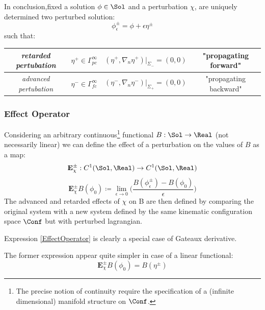 \documentclass[Main]{subfiles}
\begin{document}
		In conclusion,fixed a solution $\phi\in \Sol$ and a perturbation $\chi$, are uniquely determined two perturbed solution:
   		\begin{equation}\label{PerturbedSolution}
   			\phi^\pm_\epsilon = \phi + \epsilon \eta^\pm
   		\end{equation}
   		such that:
 		\begin{center}   \begin{tabular}{|c|c|c|c|}
   		\hline
  	 		\emph{retarded pertubation} & $\eta^+ \in \Gamma^\infty_{pc}$ & $(\eta^+, \nabla_n \eta^+ ) \big \vert_{\Sigma_{-}} = (0,0)$ & "propagating forward" \\
  	 		\hline
   			\emph{advanced pertubation} &$\eta^- \in \Gamma^\infty_{fc}$ & $(\eta^-, \nabla_n \eta^- ) \big \vert_{\Sigma_{+}} = (0,0)$ & "propagating backward" \\
   			\hline
   		\end{tabular}	\end{center} 	
		
			
   		
		\subsubsection{Effect Operator}
		Considering an arbitrary continuous\footnote{The precise notion of continuity require the specification of a (infinite dimensional) manifold structure on $\Conf$.} functional $B: \Sol \rightarrow \Real$ (not necessarily linear) we can define the effect of a perturbation on the values of $B$\cite[pag. 5]{Marolf1993} as a map:
		\begin{displaymath}
			\mathbf{E}^\pm_\chi : C^1(\Sol,\Real) \rightarrow C^1(\Sol,\Real)
		\end{displaymath}
		\begin{equation}\label{EffectOperator}
		\mathbf{E}_\chi^\pm B ( \phi_0) 
		\coloneqq \lim_{\epsilon \rightarrow 0}
		 \biggr( \frac{B(\phi_\epsilon^\pm) - B (\phi_0)}{\epsilon} \biggr)
		\end{equation}
		The advanced and retarded effects of $\chi$ on B are then defined by comparing the original system with a new system defined by the same kinematic configuration space $\Conf$ but with perturbed lagrangian.
		\begin{observation}
			Expression \ref{EffectOperator} is clearly a special case of Gateaux derivative.\cite{Blanchard2015}
		\end{observation}
		
		
		The former expression appear quite simpler in case of a linear functional:
			\begin{equation}\label{EffectOperatorLinear}
				\mathbf{E}_\chi^\pm B ( \phi_0) =  B(\eta^\pm)
			\end{equation}
		
\end{document}
